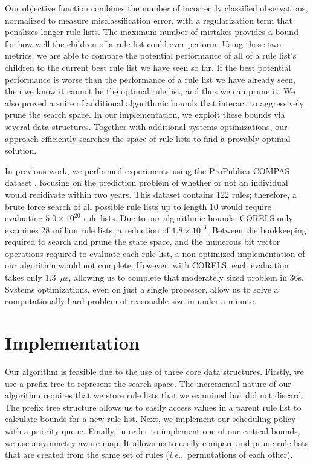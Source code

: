 \documentclass[format=sigconf]{acmart}
\def\ie{{\it i.e.},~}
\begin{document}
Our objective function combines the number of incorrectly classified observations, normalized to measure misclassification error, with a regularization term that penalizes longer rule lists.
The maximum number of mistakes provides a bound for how well the children of a rule list could ever perform.
Using those two metrics, we are able to compare the potential performance of all of a rule list's children to the current best rule list we have seen so far.
If the best potential performance is worse than the performance of a rule list we have already seen, then we know it cannot be the optimal rule list, and thus we can prune it.
We also proved a suite of additional algorithmic bounds that interact to aggressively prune the search space.
In our implementation, we exploit these bounds via several data structures.  
Together with additional systems optimizations, our approach efficiently searches the space of rule lists to find a provably optimal solution.

In previous work, we performed experiments using the ProPublica COMPAS dataset \cite{LarsonMaKiAn16}, focusing on the prediction problem of whether or not an individual would recidivate within two years.
This dataset contains 122 rules; therefore, a brute force search of all possible rule lists up to length 10 would require evaluating ${5.0 \times 10^{20}}$ rule lists.
Due to our algorithmic bounds, CORELS only examines 28 million rule lists, a reduction of ${1.8 \times 10^{13}}$.
Between the bookkeeping required to search and prune the state space, and the numerous bit vector operations required to evaluate each rule list, a non-optimized implementation of our algorithm would not complete.
However, with CORELS, each evaluation takes only 1.3~$\mu$s, allowing us to complete that moderately sized problem in 36s.
Systems optimizations, even on just a single processor, allow us to solve a computationally hard problem of reasonable size in under a minute.

\section{Implementation}
Our algorithm is feasible due to the use of three core data structures.
Firstly, we use a prefix tree to represent the search space.
The incremental nature of our algorithm requires that we store rule lists that we examined but did not discard.
The prefix tree structure allows us to easily access values in a parent rule list to calculate bounds for a new rule list.
Next, we implement our scheduling policy with a priority queue.
Finally, in order to implement one of our critical bounds, we use a symmetry-aware map.
It allows us to easily compare and prune rule lists that are created from the same set of rules (\ie permutations of each other).
\end{document}
